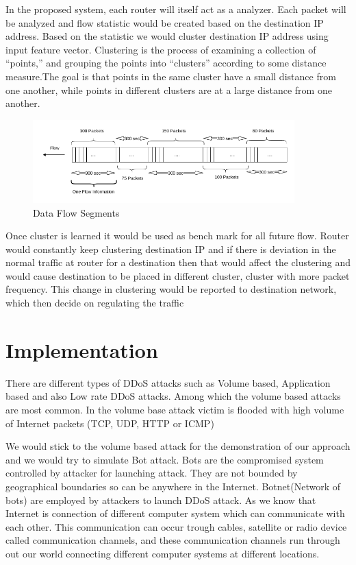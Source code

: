 \documentclass[10pt,oneside,a4paper]{article}
\begin{document}
In the proposed system, each router will itself act as a analyzer. Each packet will be analyzed and flow statistic would be created based on the destination IP address. Based on the statistic we would cluster destination IP address using input feature vector. Clustering is the process of examining a collection of “points,” and grouping the points into “clusters” according to some distance measure.The goal is that
points in the same cluster have a small distance from one another, while points in different clusters are at a large distance from one another\cite{machineLearning}.

\begin{figure}[H]
\centering
\includegraphics[width=0.90\textwidth]{Data_Flow_Capture}
\caption{Data Flow Segments} \label{fig:flow}
\end{figure}


Once cluster is learned it would be used as bench mark for all future flow. Router would constantly keep clustering destination IP and if there is deviation in the normal traffic at router for a destination then that would affect the clustering and would cause destination to be placed in different cluster, cluster with more packet frequency. This change in clustering would be reported to destination network, which then decide on regulating the traffic\par

\section{Implementation}
There are different types of DDoS attacks such as Volume based, Application based and also Low rate DDoS attacks. Among which the volume based attacks are most common. In the volume base attack victim is flooded with high volume of Internet packets (TCP, UDP, HTTP or ICMP)

We would stick to the volume based attack for the demonstration of our approach and we would try to simulate Bot attack. Bots are the compromised system controlled by attacker for launching attack. They are not bounded by geographical boundaries so can be anywhere in the Internet. Botnet(Network  of bots) are employed by attackers to launch DDoS attack. As we know that Internet is connection of different computer system which can communicate with each other. This communication can occur trough cables, satellite or radio device called communication channels, and these communication channels run through out our world connecting different computer systems at different locations.
\end{document}
